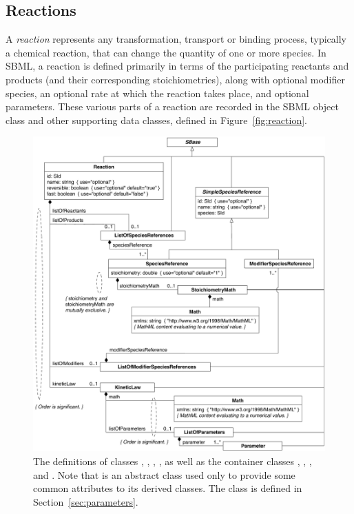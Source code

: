 \subsection{Reactions}
\label{sec:reactions}

A \emph{reaction} represents any transformation, transport or
binding process, typically a chemical reaction, that can change
the quantity of one or more species.  In SBML, a reaction is
defined primarily in terms of the participating reactants and
products (and their corresponding stoichiometries), along with
optional modifier species, an optional rate at which the reaction
takes place, and optional parameters.  These various parts of a
reaction are recorded in the SBML \Reaction object class and other
supporting data classes, defined in Figure~\vref{fig:reaction}.

\begin{figure}[htb]
  \centering
  \vspace*{2ex}
  \includegraphics[scale=0.8]{figs/reaction-uml-v2}
  \vspace*{0.5ex}
  \caption{The definitions of classes \Reaction, \KineticLaw,
      \SpeciesReference, \ModifierSpeciesReference, as well as the
      container classes \ListOfReactants, \ListOfProducts,
      \ListOfModifiers, and \ListOfParameters.  Note that
      \SimpleSpeciesReference is an abstract class used only to
      provide some common attributes to its derived classes.  The class
      \Parameter is defined in Section~\ref{sec:parameters}.}
  \label{fig:reaction}
\end{figure}


